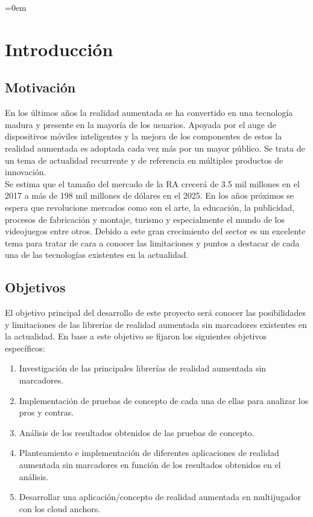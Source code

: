 \parindent=0em
\chapter{Introducción}
\noindent
\section{Motivación}
En los últimos años la realidad aumentada se ha convertido en una tecnología madura y presente en la mayoría de los usuarios. Apoyada por el auge de dispositivos móviles inteligentes y la mejora de los componentes de estos la realidad aumentada es adoptada cada vez más por un mayor público. Se trata de un tema de actualidad recurrente y de referencia en múltiples productos de innovación.\\
Se estima que el tamaño del mercado de la RA crecerá de 3.5 mil millones en el 2017 a más de 198 mil millones de dólares en el 2025. En los años próximos se espera que revolucione mercados como son el arte, la educación, la publicidad, procesos de fabricación y montaje, turismo y especialmente el mundo de los videojuegos entre otros. Debido a este gran crecimiento del sector es un excelente tema para tratar de cara a conocer las limitaciones y puntos a destacar de cada una de las tecnologías existentes en la actualidad. 
\section{Objetivos}
El objetivo principal del desarrollo de este proyecto será conocer las posibilidades y limitaciones de las librerías de realidad aumentada sin marcadores existentes en la actualidad. En base a este objetivo se fijaron los siguientes objetivos específicos:
\begin{enumerate}
\item Investigación de las principales librerías de realidad aumentada sin marcadores.
\item Implementación de pruebas de concepto de cada una de ellas para analizar los pros y contras.
\item Análisis de los resultados obtenidos de las pruebas de concepto.
\item Planteamiento e implementación de diferentes aplicaciones de realidad aumentada sin marcadores en función de los resultados obtenidos en el análisis.
\item Desarrollar una aplicación/concepto de realidad aumentada en multijugador con los cloud anchors.
\end{enumerate}

